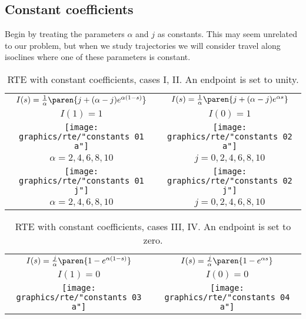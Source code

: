 \subsection{\label{subsec:constant coefficients}Constant coefficients}

Begin by treating the parameters $\alpha$ and $j$ as constants. This may seem unrelated to our problem, but when we study trajectories we will consider travel along isoclines where one of these parameters is constant.

%
\begin{landscape}
%
\begin{table}[htbp]
\caption[RTE with constant coefficients, cases I, II]{RTE with constant coefficients, cases I, II. An endpoint is set to unity.}
\begin{center}
\begin{tabular}{cc}
%
$I(s) = \frac{1}{\alpha}\paren{j+(\alpha-j)e^{\alpha(1-s)}}$ & $I(s) = \frac{1}{\alpha}\paren{j+(\alpha-j)e^{\alpha s}}$ \\[4pt]
%
$I(1) = 1$ & $I(0) = 1$ \\
%
\texttt{[image: graphics/rte/"constants 01 a"]} &
\texttt{[image: graphics/rte/"constants 02 a"]} \\[-12pt]
%
$\alpha = 2, 4, 6, 8, 10$& $j = 0, 2, 4, 6, 8, 10$\\
%
\texttt{[image: graphics/rte/"constants 01 j"]} &
\texttt{[image: graphics/rte/"constants 02 j"]} \\[-12pt]
%
$\alpha = 2, 4, 6, 8, 10$ & $j = 0, 2, 4, 6, 8, 10$\\
%
\end{tabular}
\end{center}
\label{tab:ode:constant:1}
\end{table}
%
%
\begin{table}[htbp]
\caption[RTE with constant coefficients, cases III, IV]{RTE with constant coefficients, cases III, IV. An endpoint is set to zero.}
\begin{center}
\begin{tabular}{cc}
%
$I(s) = \frac{j}{\alpha}\paren{1-e^{\alpha(1-s)}}$ & $I(s) = \frac{j}{\alpha}\paren{1-e^{\alpha s}}$ \\[4pt]
%
$I(1) = 0$ & $I(0) = 0$ \\
%
\texttt{[image: graphics/rte/"constants 03 a"]} &
\texttt{[image: graphics/rte/"constants 04 a"]} \\[-12pt]
%

\end{tabular}
\end{center}
\end{table}
\end{landscape}
